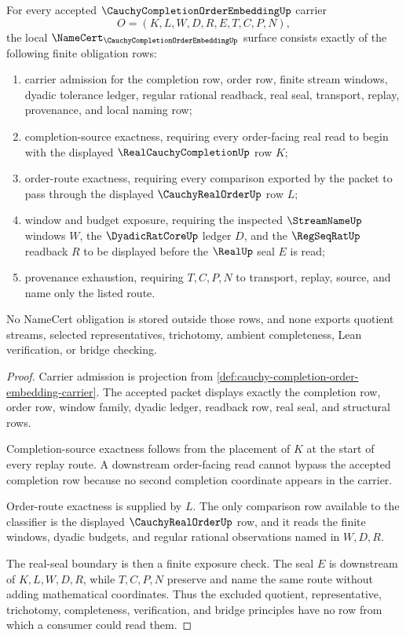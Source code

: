 \begin{theorem}
\label{thm:cauchy-completion-order-embedding-namecert-obligations}
For every accepted $\CauchyCompletionOrderEmbeddingUp$ carrier
$$
O=(K,L,W,D,R,E,T,C,P,N),
$$
the local $\NameCert_{\CauchyCompletionOrderEmbeddingUp}$ surface consists exactly of the following finite obligation rows:
\begin{enumerate}
\item carrier admission for the completion row, order row, finite stream windows, dyadic tolerance ledger, regular rational readback, real seal, transport, replay, provenance, and local naming row;
\item completion-source exactness, requiring every order-facing real read to begin with the displayed $\RealCauchyCompletionUp$ row $K$;
\item order-route exactness, requiring every comparison exported by the packet to pass through the displayed $\CauchyRealOrderUp$ row $L$;
\item window and budget exposure, requiring the inspected $\StreamNameUp$ windows $W$, the $\DyadicRatCoreUp$ ledger $D$, and the $\RegSeqRatUp$ readback $R$ to be displayed before the $\RealUp$ seal $E$ is read;
\item provenance exhaustion, requiring $T,C,P,N$ to transport, replay, source, and name only the listed route.
\end{enumerate}
No NameCert obligation is stored outside those rows, and none exports quotient streams, selected representatives, trichotomy, ambient completeness, Lean verification, or bridge checking.
\end{theorem}
\begin{proof}
Carrier admission is projection from \autoref{def:cauchy-completion-order-embedding-carrier}. The accepted packet displays exactly the completion row, order row, window family, dyadic ledger, readback row, real seal, and structural rows.

Completion-source exactness follows from the placement of $K$ at the start of every replay route. A downstream order-facing read cannot bypass the accepted completion row because no second completion coordinate appears in the carrier.

Order-route exactness is supplied by $L$. The only comparison row available to the classifier is the displayed $\CauchyRealOrderUp$ row, and it reads the finite windows, dyadic budgets, and regular rational observations named in $W,D,R$.

The real-seal boundary is then a finite exposure check. The seal $E$ is downstream of $K,L,W,D,R$, while $T,C,P,N$ preserve and name the same route without adding mathematical coordinates. Thus the excluded quotient, representative, trichotomy, completeness, verification, and bridge principles have no row from which a consumer could read them.
\end{proof}

